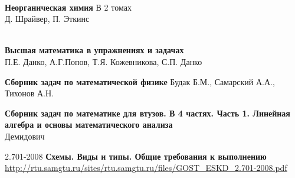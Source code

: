 \begin{thebibliography}{99}
\ \\
\textbf{Неорганическая химия} В 2 томах\\
Д. Шрайвер, П. Эткинс



\ \\
\textbf{Высшая математика в упражнениях и задачах}\\
П.Е. Данко, А.Г.Попов, Т.Я. Кожевникова, С.П. Данко

\textbf{Сборник задач по математической физике}
Будак Б.М., Самарский А.А., Тихонов А.Н.

\textbf{Сборник задач по математике для втузов. В 4 частях. Часть 1. Линейная
алгебра и основы математического анализа}\\
Демидович


2.701-2008 \textbf{Схемы. Виды и типы. Общие требования к выполнению}\\
\url{http://rtu.samgtu.ru/sites/rtu.samgtu.ru/files/GOST_ESKD_2.701-2008.pdf}

\end{thebibliography}
